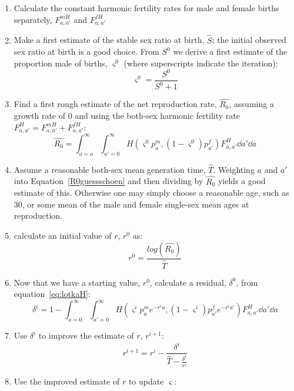 \begin{enumerate}
  \item Calculate the constant harmonic fertility rates for male and female
  births separately, $F_{a,a'}^{mH}$ and $F_{a,a'}^{fH}$
  \item Make a first estimate of the stable sex ratio at birth, $\hat{S}$; the
  initial observed sex ratio at birth is a good choice. From $S^0$ we derive a
  first estimate of the proportion male of births, $\varsigma^0$ (where
  superscripts indicate the iteration):
  \begin{equation}
  \varsigma^0 = \frac{S^0}{S^0+1}
  \end{equation}
  \item Find a first rough estimate of the net reproduction rate,
  $\widehat{R_0}$, assuming a growth rate of 0 and using the both-sex
  harmonic fertility rate $F_{a,a'}^{H} = F_{a,a'}^{mH} + F_{a,a'}^{fH}$:
  \begin{equation}
  \label{R0guessschoen}
  \widehat{R_0} = \int_{a=o}^\infty \int_{a'=0}^\infty H(\varsigma^0 p_a^m,
  (1-\varsigma^0)p_{a'}^f) F_{a,a'}^{H} \dd a' \dd a
  \end{equation}
  \item Assume a reasonable both-sex mean generation time, $\widehat{T}$.
  Weighting $a$ and $a'$ into Equation~\eqref{R0guessschoen} and then dividing
  by $\widehat{R_0}$ yields a good estimate of this. Otherwise one may simply
  choose a reasonable age, such as 30, or some mean of the male and female
  single-sex mean ages at reproduction.
  \item calculate an initial value of $r$, $r^0$ as:
  \begin{equation}
  r^0 = \frac{log(\widehat{R_0})}{\widehat{T}}
  \end{equation}
  \item Now that we have a starting value, $r^0$, calculate a residual,
  $\delta^0$, from equation~\eqref{eq:lotkaH}:
  \begin{equation}
  \delta^i = 1 - \int _{a=0}^\infty \int _{a'=0}^\infty H(\varsigma^i p_a^m
  e^{-r^ia}, (1-\varsigma^i)p_{a'}^fe^{-r^ia'}) F_{a,a'}^H \dd a' \dd a
  \end{equation}
  \item Use $\delta^i$ to improve the estimate of $r$, $r^{i+1}$:
  \begin{equation}
  r^{i+1} = r^i - \frac{\delta^i}{\widehat{T} - \frac{\delta^i}{r^i}}
  \end{equation}
  \item Use the improved estimate of $r$ to update $\varsigma$:

\end{enumerate}
